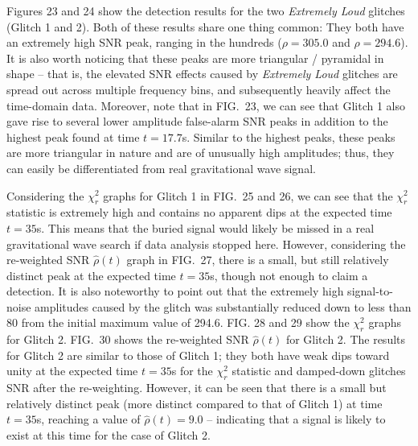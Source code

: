 \documentclass[preprint,
letterpaper,
 amsmath,amssymb,
 aps,
]{revtex4-2}
\begin{document}
Figures 23 and 24 show the detection results for the two \textit{Extremely Loud} glitches (Glitch 1 and 2). Both of these results share one thing common: They both have an extremely high SNR peak, ranging in the hundreds ($\rho=305.0$ and $\rho=294.6$). It is also worth noticing that these peaks are more triangular / pyramidal in shape – that is, the elevated SNR effects caused by \textit{Extremely Loud} glitches are spread out across multiple frequency bins, and subsequently heavily affect the time-domain data. Moreover, note that in FIG.\ 23, we can see that Glitch 1 also gave rise to several lower amplitude false-alarm SNR peaks in addition to the highest peak found at time $t=17.7$s. Similar to the highest peaks, these peaks are more triangular in nature and are of unusually high amplitudes; thus, they can easily be differentiated from real gravitational wave signal. 

Considering the $\chi^2_r$ graphs for Glitch 1 in FIG.\ 25 and 26, we can see that the $\chi^2_r$ statistic is extremely high and contains no apparent dips at the expected time $t=35$s. This means that the buried signal would likely be missed in a real gravitational wave search if data analysis stopped here. However, considering the re-weighted SNR $\hat{\rho}(t)$ graph in FIG.\ 27, there is a small, but still relatively distinct peak at the expected time $t=35$s, though not enough to claim a detection. It is also noteworthy to point out that the extremely high signal-to-noise amplitudes caused by the glitch was substantially reduced down to less than 80 from the initial maximum value of 294.6.  FIG. 28 and 29 show the  $\chi^2_r$ graphs for Glitch 2. FIG.\ 30 shows the re-weighted SNR $\hat{\rho}(t)$ for Glitch 2. The results for Glitch 2 are similar to those of Glitch 1; they both have weak dips toward unity at the expected time $t=35$s for the $\chi_r^2$ statistic and damped-down glitches SNR after the re-weighting. However, it can be seen that there is a small but relatively distinct peak (more distinct compared to that of Glitch 1) at time $t=35$s, reaching a value of $\hat{\rho}(t)=9.0$ – indicating that a signal is likely to exist at this time for the case of Glitch 2.
\end{document}
